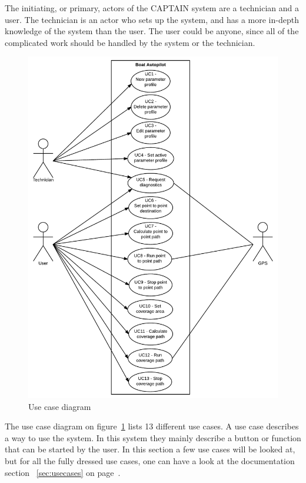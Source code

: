 The initiating, or primary, actors of the CAPTAIN system are a technician and a user. The technician is an actor who sets up the system, and has a more in-depth knowledge of the system than the user. The user could be anyone, since all of the complicated work should be handled by the system or the technician. 

\begin{figure}[H]
\centering
\includegraphics[max width =1\linewidth]{../Appendix/Project/Dokumentation/Images/Requirements_specification/Usecase_diagram}
\caption{Use case diagram}
\label{fig:usecasediagram}
\end{figure}

The use case diagram on figure~\ref{fig:usecasediagram} lists 13 different use cases. A use case describes a way to use the system. In this system they mainly describe a button or function that can be started by the user. In this section a few use cases will be looked at, but for all the fully dressed use cases, one can have a look at the documentation section ~\ref{sec:usecases} on page~\pageref{sec:usecases}.

